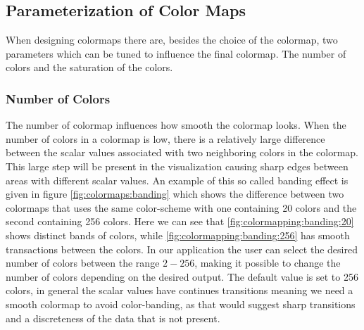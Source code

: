 \subsection{Parameterization of Color Maps}
\label{ss:colormaps:parameterization}
When designing colormaps there are, besides the choice of the colormap, two parameters which can be tuned to influence the final colormap. The number of colors and the saturation of the colors.

\subsubsection{Number of Colors} %
\label{ssub:number_of_colors}
The number of colormap influences how smooth the colormap looks. When the number of colors in a colormap is low, there is a relatively large difference between the scalar values associated with two neighboring colors in the colormap. This large step will be present in the visualization causing sharp edges between areas with different scalar values. An example of this so called banding effect is given in figure \ref{fig:colormaps:banding} which shows the difference between two colormaps that uses the same color-scheme with one containing 20 colors and the second containing 256 colors. Here we can see that \cref{fig:colormapping:banding:20} shows distinct bands of colors, while \cref{fig:colormapping:banding:256} has smooth transactions between the colors. In our application the user can select the desired number of colors between the range $2 - 256$, making it possible to change the number of colors depending on the desired output. The default value is set to 256 colors, in general the scalar values have continues transitions meaning we need a smooth colormap to avoid color-banding, as that would suggest sharp transitions and a discreteness of the data that is not present.
